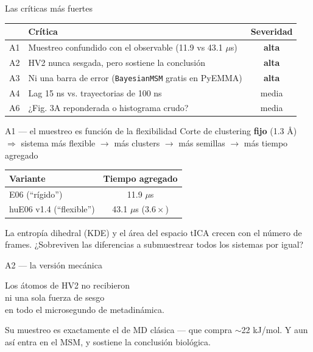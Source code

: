 \documentclass[aspectratio=169,11pt]{beamer}
\begin{document}
\begin{frame}{Las críticas más fuertes}
  \small
  \begin{center}
  \begin{tabular}{clc}
    \toprule
    & Crítica & Severidad \\
    \midrule
    A1 & Muestreo confundido con el observable (11.9 vs 43.1 $\mu$s) & \textcolor{red!70!black}{\textbf{alta}} \\
    A2 & HV2 nunca sesgada, pero sostiene la conclusión & \textcolor{red!70!black}{\textbf{alta}} \\
    A3 & Ni una barra de error (\texttt{BayesianMSM} gratis en PyEMMA) & \textcolor{red!70!black}{\textbf{alta}} \\
    A4 & Lag 15 ns vs. trayectorias de 100 ns & media \\
    A6 & ¿Fig. 3A reponderada o histograma crudo? & media \\
    \bottomrule
  \end{tabular}
  \end{center}
\end{frame}

\begin{frame}{A1 — el muestreo es función de la flexibilidad}
  Corte de clustering \textbf{fijo} (1.3 \r{A}) $\Rightarrow$ sistema más flexible $\to$ más clusters $\to$ más semillas $\to$ más tiempo agregado
  \begin{center}
  \small
  \begin{tabular}{lc}
    \toprule
    Variante & Tiempo agregado \\
    \midrule
    E06 (``rígido'') & 11.9 $\mu$s \\
    huE06 v1.4 (``flexible'') & 43.1 $\mu$s \quad ($3.6\times$) \\
    \bottomrule
  \end{tabular}
  \end{center}
  \vspace{0.4em}
  \alert{La entropía dihedral (KDE) y el área del espacio tICA crecen con el número de frames.} ¿Sobreviven las diferencias a submuestrear todos los sistemas por igual?
\end{frame}

\begin{frame}{A2 — la versión mecánica}
  \begin{center}
    \Large
    Los átomos de HV2 no recibieron\\
    \alert{ni una sola fuerza de sesgo}\\
    en todo el microsegundo de metadinámica.
  \end{center}
  \vspace{0.8em}
  \small\color{migris}
  \centering Su muestreo es exactamente el de MD clásica — que compra $\sim$22 kJ/mol. Y aun así entra en el MSM, y sostiene la conclusión biológica.
\end{frame}
\end{document}
